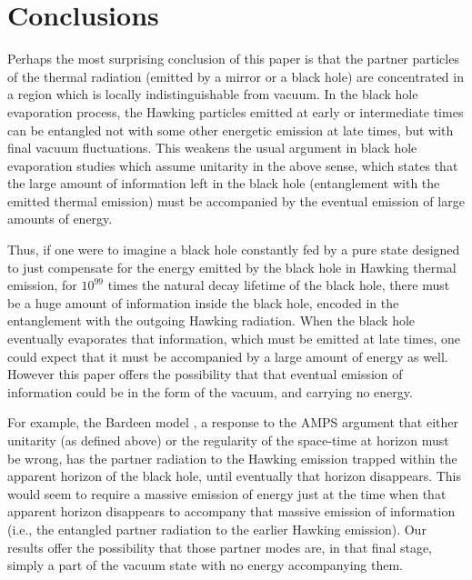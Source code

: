 \documentclass[aps,prd,showpacs,amssymb,nofootinbib,twocolumn]{revtex4}
\begin{document}


\section{Conclusions}

Perhaps the most surprising conclusion of this paper is that the partner 
particles of the thermal radiation (emitted by a mirror or a black hole) 
are concentrated in a region which is locally indistinguishable from vacuum.
%
In the black hole evaporation process, the Hawking particles emitted at 
early or intermediate times can be entangled not with some other energetic 
emission at late times, but with final vacuum fluctuations. 
%
This weakens the usual argument in black hole evaporation studies which assume 
unitarity in the above sense, which states that the large amount of 
information left in the black hole 
(entanglement with the emitted thermal emission) must be accompanied 
by the eventual emission of large amounts of energy.

Thus, if one were to imagine a black hole constantly fed by a pure state 
designed to just compensate for the energy emitted by the black hole in 
Hawking thermal emission, for $10^{99}$ times the natural decay lifetime 
of the black hole, there must be a huge amount of information inside the 
black hole, encoded in the entanglement with the outgoing Hawking radiation. 
%
When the black hole eventually evaporates that information, which must be 
emitted at late times, one could expect that it must be accompanied by a 
large amount of energy as well. 
%
However this paper offers the possibility that that eventual emission of 
information could be in the form of the vacuum, and carrying no energy. 

For example, the Bardeen model \cite{bardeen}, a response to the 
AMPS \cite{amps} argument that either unitarity (as defined above) 
or the regularity of the space-time at horizon must be wrong, has the partner 
radiation to the Hawking emission trapped within the apparent horizon of the 
black hole, until eventually that horizon disappears. 
%
This would seem to require a massive emission of energy just at the time when 
that apparent horizon disappears to accompany that massive emission of 
information (i.e., the entangled partner radiation to the earlier Hawking 
emission). 
%
Our results offer the possibility that those partner modes are, in that final 
stage, simply a part of the vacuum state with no energy accompanying them.
\end{document}
